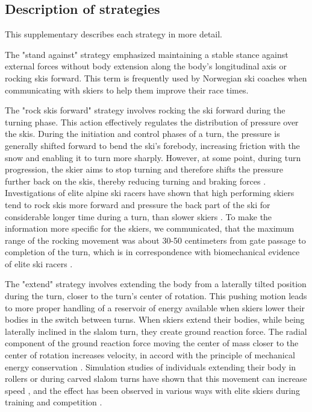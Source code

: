 \documentclass[pdflatex,sn-mathphys-num]{sn-jnl}%
\theoremstyle{thmstyleone}%
\theoremstyle{thmstyletwo}%
\theoremstyle{thmstylethree}%
\begin{document}
\begin{appendices}

\section{Description of strategies}\label{sup_strategies}
This supplementary describes each strategy in more detail. 

The "stand against" strategy emphasized maintaining a stable stance against external forces without body extension along the body's longitudinal axis or rocking skis forward. This term is frequently used by Norwegian ski coaches when communicating with skiers to help them improve their race times. 

The "rock skis forward" strategy involves rocking the ski forward during the turning phase. This action effectively regulates the distribution of pressure over the skis. During the initiation and control phases of a turn, the pressure is generally shifted forward to bend the ski's forebody, increasing friction with the snow and enabling it to turn more sharply. However, at some point, during turn progression, the skier aims to stop turning and therefore shifts the pressure further back on the skis, thereby reducing turning and braking forces \cite{lemaster_skiers_1999, lemaster_ultimate_2010}. Investigations of elite alpine ski racers have shown that high performing skiers tend to rock skis more forward and pressure the back part of the ski for considerable longer time during a turn, than slower skiers \cite{reid_kinematic_2010, tjorhom_beskrivelse_2007, reid_alpine_2020}. To make the information more specific for the skiers, we communicated, that the maximum range of the rocking movement was about 30-50 centimeters from gate passage to completion of the turn, which is in correspondence with biomechanical evidence of elite ski racers \cite{reid_kinematic_2010}. 

The "extend" strategy involves extending the body from a laterally tilted position during the turn, closer to the turn's center of rotation. This pushing motion leads to more proper handling of a reservoir of energy available when skiers lower their bodies in the switch between turns. When skiers extend their bodies, while being laterally inclined in the slalom turn, they create ground reaction force. The radial component of the ground reaction force moving the center of mass closer to the center of rotation increases velocity, in accord with the principle of mechanical energy conservation \cite{lind_physics_2013}. Simulation studies of individuals extending their body in rollers or during carved slalom turns have shown that this movement can increase speed \cite{mote_accelerations_1983,luginbuhl_identification_2023}, and the effect has been observed in various ways with elite skiers during training and competition \cite{reid_kinematic_2010, magelssen_is_2022, supej_differential_2008}. 


\end{appendices}
\end{document}
